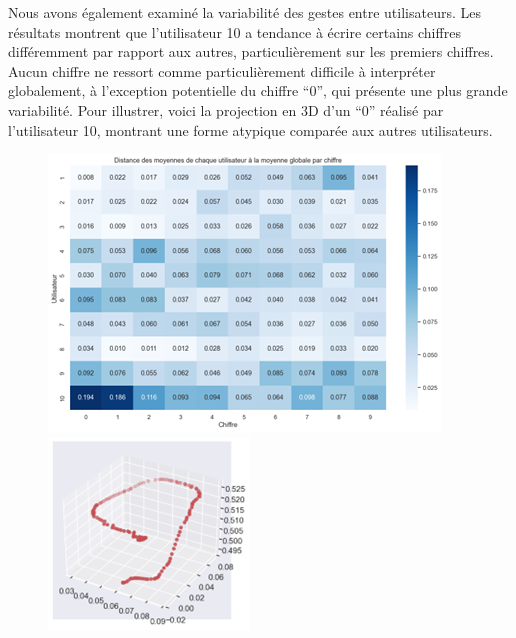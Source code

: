 \documentclass{article}
\begin{document}
Nous avons également examiné la variabilité des gestes entre utilisateurs. Les résultats montrent que l’utilisateur 10 a tendance à écrire certains chiffres différemment par rapport aux autres, particulièrement sur les premiers chiffres. Aucun chiffre ne ressort comme particulièrement difficile à interpréter globalement, à l’exception potentielle du chiffre “0”, qui présente une plus grande variabilité.
Pour illustrer, voici la projection en 3D d’un “0” réalisé par l’utilisateur 10, montrant une forme atypique comparée aux autres utilisateurs.

\begin{figure}[H]
    \centering
    \begin{minipage}{0.64\textwidth}
        \centering
        \includegraphics[width=\textwidth]{dist_moyennes_user_moyenne_globale.png}
    \end{minipage}
    \hfill
    \begin{minipage}{0.35\textwidth}
        \centering
        \includegraphics[width=\textwidth]{chiffre_moche.png}
    \end{minipage}
\end{figure}
\end{document}
